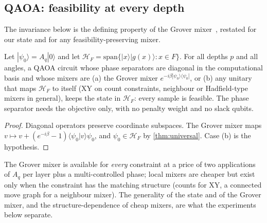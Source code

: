 \subsection{QAOA: feasibility at every depth}\label{sec:qaoa}
The invariance below is the defining property of the Grover mixer~\cite{bartschi2020gm}, restated for our state and for any feasibility-preserving mixer.

\begin{theorem}\label{thm:qaoa}
Let $|\psi_0\rangle=A_q|0\rangle$ and let $\mathcal H_F=\mathrm{span}\{|x\rangle|g(x)\rangle:x\in F\}$. For all depths $p$ and all angles, a QAOA circuit whose phase separators are diagonal in the computational basis and whose mixers are (a) the Grover mixer $e^{-i\beta|\psi_0\rangle\langle\psi_0|}$, or (b) any unitary that maps $\mathcal H_F$ to itself (XY on count constraints, neighbour or Hadfield-type mixers in general), keeps the state in $\mathcal H_F$: every sample is feasible. The phase separator needs the objective only, with no penalty weight and no slack qubits.
\end{theorem}
\begin{proof}
Diagonal operators preserve coordinate subspaces. The Grover mixer maps $v\mapsto v+(e^{-i\beta}-1)\langle\psi_0|v\rangle\psi_0$, and $\psi_0\in\mathcal H_F$ by \cref{thm:universal}. Case (b) is the hypothesis.
\end{proof}
The Grover mixer is available for \emph{every} constraint at a price of two applications of $A_q$ per layer plus a multi-controlled phase; local mixers are cheaper but exist only when the constraint has the matching structure (counts for XY, a connected move graph for a neighbour mixer). The generality of the state and of the Grover mixer, and the structure-dependence of cheap mixers, are what the experiments below separate.
